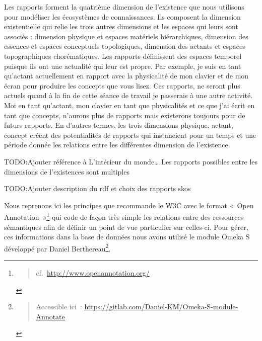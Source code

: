 \documentclass[
  letterpaper,
  DIV=11,
  numbers=noendperiod]{scrreprt}
\begin{document}
Les rapports forment la quatrième dimension de l'existence que nous
utilisons pour modéliser les écosystèmes de connaissances. Ils composent
la dimension existentielle qui relie les trois autres dimensions et les
espaces qui leurs sont associés : dimension physique et espaces
matériels hiérarchiques, dimension des essences et espaces conceptuels
topologiques, dimension des actants et espaces topographiques
chorématiques. Les rapports définissent des espaces temporel puisque ils
ont une actualité qui leur est propre. Par exemple, je suis en tant
qu'actant actuellement en rapport avec la physicalité de mon clavier et
de mon écran pour produire les concepts que vous lisez. Ces rapports, ne
seront plus actuels quand à la fin de cette séance de travail je
passerais à une autre activité. Moi en tant qu'actant, mon clavier en
tant que physicalités et ce que j'ai écrit en tant que concepts,
n'aurons plus de rapports mais existerons toujours pour de futurs
rapports. En d'autres termes, les trois dimensions physique, actant,
concept créent des potentialités de rapports qui instancient pour un
temps et une période donnée les relations entre les différentes
dimension de l'existence.

TODO:Ajouter référence à L'intérieur du monde\ldots{} Les rapports
possibles entre les dimensions de l'existences sont multiples

TODO:Ajouter description du rdf et choix des rapports skos

Nous reprenons ici les principes que recommande le W3C avec le format
«~Open Annotation~»\footnote{\begin{quote}
  cf.~\url{http://www.openannotation.org/}
  \end{quote}} qui code de façon très simple les relations entre des
ressources sémantiques afin de définir un point de vue particulier sur
celles-ci. Pour gérer, ces informations dans la base de données nous
avons utilisé le module Omeka S développé par Daniel
Berthereau\footnote{\begin{quote}
  Accessible ici~:
  \url{https://gitlab.com/Daniel-KM/Omeka-S-module-Annotate}
  \end{quote}}.
\end{document}
